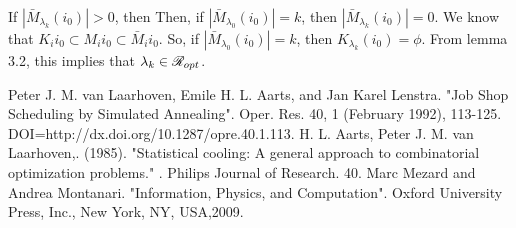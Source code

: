 \documentclass[letterpaper,english,10pt]{article}
\begin{document}
If $|\bar M_{\lambda_k}(i_0)| > 0$, then
Then, if $|\bar M_{\lambda_0}(i_0)| = k$, then $|\bar M_{\lambda_k}(i_0)| = 0$. 
We know that $K_i{i_0} \subset M_i{i_0} \subset \bar M_i{i_0}$. So, if $|\bar M_{\lambda_0}(i_0)| = k$, then  $K_{\lambda_k}(i_0)= \phi$. From lemma 3.2, this implies that $\lambda_k \in \mathscr{R}_{opt}$.
\begin{thebibliography}{10}
Peter J. M. van Laarhoven, Emile H. L. Aarts, and Jan Karel Lenstra. "Job Shop Scheduling by Simulated Annealing". Oper. Res. 40, 1 (February 1992), 113-125. DOI=http://dx.doi.org/10.1287/opre.40.1.113.
H. L. Aarts, Peter J. M. van Laarhoven,. (1985). 
"Statistical cooling: A general approach to combinatorial optimization problems."
. Philips Journal of Research. 40. 
Marc Mezard and Andrea Montanari. 
"Information, Physics, and Computation".
 Oxford University Press, Inc., New York, NY, USA,2009.  
\end{thebibliography}
\end{document}
